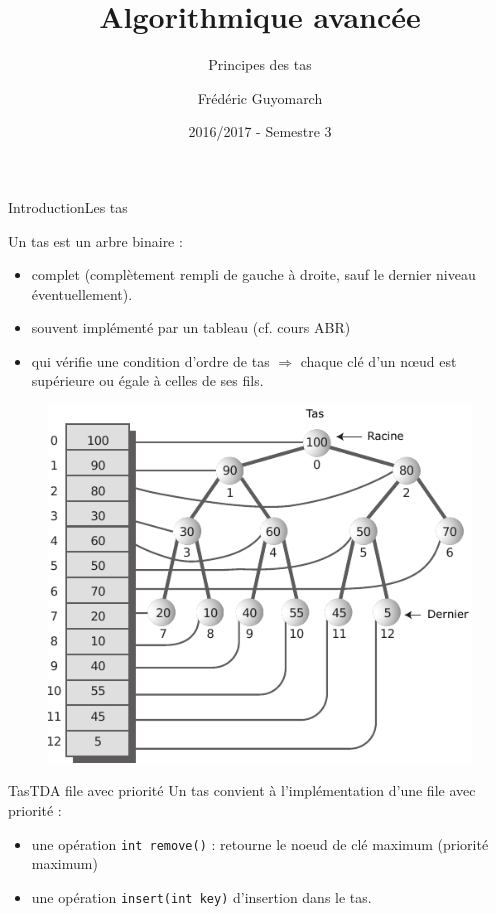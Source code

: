 \documentclass[12pt,a4paper]{beamer}
\title{\textbf{Algorithmique avancée}}
\subtitle{Principes des tas}
\author{Frédéric Guyomarch}
\date{2016/2017 - Semestre 3}
\institute %
{

  Université de Lille1\\
  IUT-A de Lille

}
\newcommand{\hl}[1]{\textcolor{blueemph}{#1}}
\begin{document}
\begin{frame}
\titlepage
\end{frame}


\begin{frame}{Introduction}{Les tas}

Un tas est un arbre binaire : 
\begin{itemize}
\item \hl{complet} (complètement rempli de gauche à droite, sauf le dernier niveau éventuellement).
\item souvent implémenté par un tableau (cf. cours ABR)
\item qui vérifie une \hl{condition d'ordre} de tas $\Rightarrow$ chaque clé d'un n\oe ud est supérieure ou égale à celles de ses fils.
\end{itemize}
\end{frame}


\begin{frame}
\begin{figure}
\includegraphics[scale=1]{figs/heap}
\end{figure}
\end{frame}

\begin{frame}{Tas}{TDA file avec priorité}
Un tas convient à l'implémentation d'une file avec priorité :
\begin{itemize}
\item une opération \texttt{int remove()} : retourne le noeud de clé maximum (priorité maximum)
\item une opération \texttt{insert(int key)} d'insertion dans le tas.
\end{itemize}

\end{frame}
\end{document}
